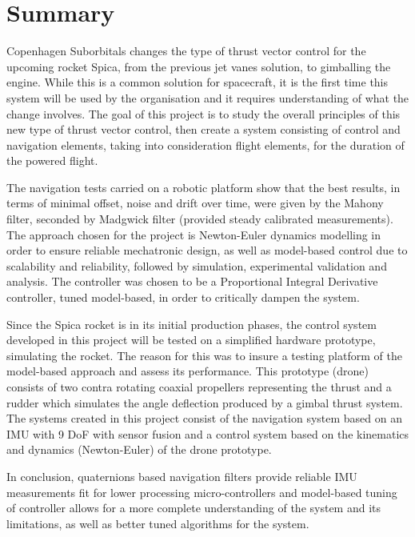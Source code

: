 \chapter{Summary}
\begin{flushleft}
Copenhagen Suborbitals changes the type of thrust vector control for the upcoming rocket Spica, from the previous jet vanes solution, to gimballing the engine.
While this is a common solution for spacecraft, it is the first time this system will be used by the organisation and it requires understanding of what the change involves.
The goal of this project is to study the overall principles of this new type of thrust vector control, then create a system consisting of control and navigation elements, taking into consideration flight elements, for the duration of the powered flight. 

The navigation tests carried on a robotic platform show that the best results, in terms of minimal offset, noise and drift over time, were given by the Mahony filter, seconded by Madgwick filter (provided steady calibrated measurements).
The approach chosen for the project is Newton-Euler dynamics modelling in order to ensure reliable mechatronic design, as well as model-based control due to scalability and reliability, followed by simulation, experimental validation and analysis. The controller was chosen to be a Proportional Integral Derivative controller, tuned model-based, in order to critically dampen the system. 

Since the Spica rocket is in its initial production phases, the control system developed in this project will be tested on a simplified hardware prototype, simulating the rocket. The reason for this was to insure a testing platform of the model-based approach and assess its performance. 
This prototype (drone) consists of two contra rotating coaxial propellers representing the thrust and a rudder which simulates the angle deflection produced by a gimbal thrust system. 
The systems created in this project consist of the navigation system based on an IMU with 9 DoF with sensor fusion and a control system based on the kinematics and dynamics (Newton-Euler) of the drone prototype. 

In conclusion, quaternions based navigation filters provide reliable IMU measurements fit for lower processing micro-controllers and model-based tuning of controller allows for a more complete understanding of the system and its limitations, as well as better tuned algorithms for the system. 

\end{flushleft}
